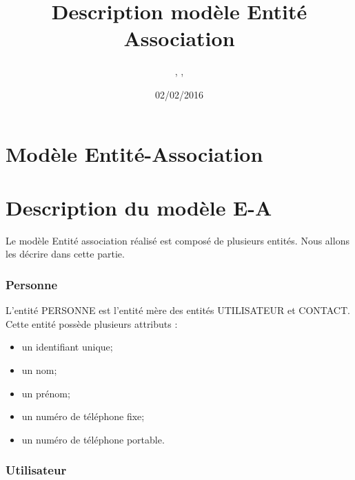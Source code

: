 \documentclass[asi, sansVersion]{picINSA}
\begin{document}
\title{Description modèle Entité Association}
\author{\Florian, \Mathieu, \Julie}
\date{02/02/2016} 

\maketitle

\tableofcontents

\chapter{Modèle Entité-Association}


\chapter{Description du modèle E-A}

Le modèle Entité association réalisé est composé de plusieurs entités. Nous allons les décrire dans cette partie. \\ 

\subsection*{Personne}

L'entité PERSONNE est l'entité mère des entités UTILISATEUR et CONTACT. \\
Cette entité possède plusieurs attributs : 
\begin{itemize}
\item un identifiant unique;
\item un nom; %
\item un prénom; %
\item un numéro de téléphone fixe; %
\item un numéro de téléphone portable. %
\end{itemize}

\subsection*{Utilisateur}
\end{document}
